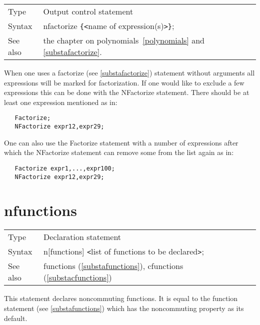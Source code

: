 \noindent \begin{tabular}{ll}
Type & Output control statement\\
Syntax & nfactorize \verb:{:{\tt<}name of expression(s){\tt>}\verb:}:;
\\ See also & the chapter on polynomials~\ref{polynomials} and 
\ref{substafactorize}.
\end{tabular} \vspace{4mm}

\noindent When one uses a factorize (see \ref{substafactorize}) statement 
without arguments all expressions will be marked for factorization. If one 
would like to exclude a few expressions this can be done with the 
NFactorize statement. There should be at least one expression mentioned as 
in:
\begin{verbatim}
   Factorize;
   NFactorize expr12,expr29;
\end{verbatim}
One can also use the Factorize statement with a number of expressions after 
which the NFactorize statement can remove some from the list again as in:
\begin{verbatim}
   Factorize expr1,...,expr100;
   NFactorize expr12,expr29;
\end{verbatim}

\vspace{10mm}

 
\section{nfunctions}
\label{substanfunctions}

\noindent \begin{tabular}{ll}
Type & Declaration statement\\
Syntax & n[functions] {\tt<}list of functions to be declared{\tt>}; \\
See also & functions (\ref{substafunctions}), cfunctions (\ref{substacfunctions})
\end{tabular} \vspace{4mm}

\noindent This statement declares 
noncommuting functions. It is equal to the 
function statement (see \ref{substafunctions}) which has 
the noncommuting property as its default. \vspace{10mm}


